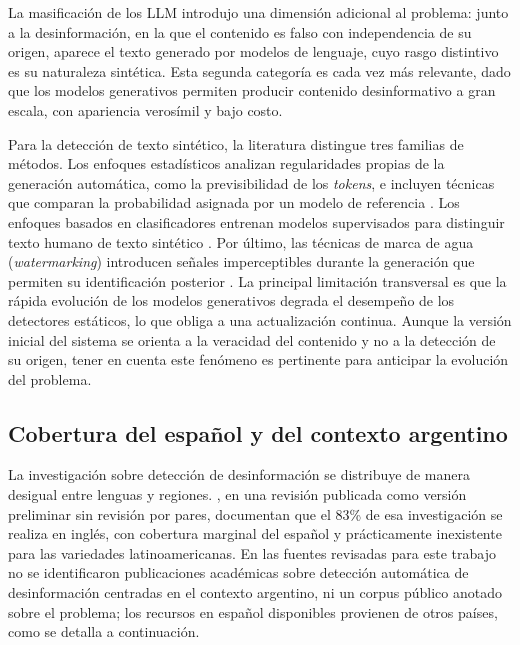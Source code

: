 La masificación de los LLM introdujo una dimensión adicional al problema: junto a la desinformación, en la que el contenido es falso con independencia de su origen, aparece el texto generado por modelos de lenguaje, cuyo rasgo distintivo es su naturaleza sintética. Esta segunda categoría es cada vez más relevante, dado que los modelos generativos permiten producir contenido desinformativo a gran escala, con apariencia verosímil y bajo costo.

Para la detección de texto sintético, la literatura distingue tres familias de métodos. Los enfoques estadísticos analizan regularidades propias de la generación automática, como la previsibilidad de los \textit{tokens}, e incluyen técnicas que comparan la probabilidad asignada por un modelo de referencia \parencite{GehrmannEtAl2019,MitchellEtAl2023}. Los enfoques basados en clasificadores entrenan modelos supervisados para distinguir texto humano de texto sintético \parencite{ZellersEtAl2019}. Por último, las técnicas de marca de agua (\textit{watermarking}) introducen señales imperceptibles durante la generación que permiten su identificación posterior \parencite{KirchenbauerEtAl2023}. La principal limitación transversal es que la rápida evolución de los modelos generativos degrada el desempeño de los detectores estáticos, lo que obliga a una actualización continua. Aunque la versión inicial del sistema se orienta a la veracidad del contenido y no a la detección de su origen, tener en cuenta este fenómeno es pertinente para anticipar la evolución del problema.

\subsection{Cobertura del español y del contexto argentino}

La investigación sobre detección de desinformación se distribuye de manera desigual entre lenguas y regiones. \textcite{WangEtAl2024survey}, en una revisión publicada como versión preliminar sin revisión por pares, documentan que el 83\% de esa investigación se realiza en inglés, con cobertura marginal del español y prácticamente inexistente para las variedades latinoamericanas. En las fuentes revisadas para este trabajo no se identificaron publicaciones académicas sobre detección automática de desinformación centradas en el contexto argentino, ni un corpus público anotado sobre el problema; los recursos en español disponibles provienen de otros países, como se detalla a continuación.

